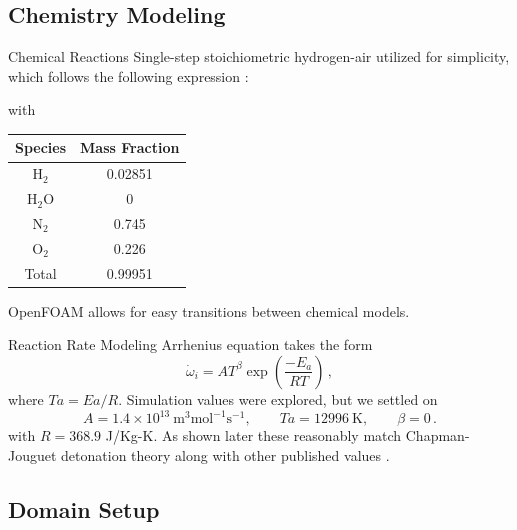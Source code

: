 \subsection{Chemistry Modeling}

\begin{frame}{Chemical Reactions}
Single-step stoichiometric hydrogen-air utilized for simplicity, which follows the following expression \cite{kuo}:
\begin{center}
\end{center}
with
\begin{table}[t!]
\centering
\begin{tabular}{cc}
Species & Mass Fraction \\ \hline
H\(_2\) & 0.02851 \\ 
H\(_2\)O & 0 \\
N\(_2\) & 0.745 \\ 
O\(_2\) & 0.226 \\ \hline
Total & 0.99951 \\ 
\end{tabular}
\end{table}
OpenFOAM allows for easy transitions between chemical models.
\end{frame}

\begin{frame}{Reaction Rate Modeling}
Arrhenius equation \cite{arrhenius} takes the form \cite{christ} 
\begin{equation}
\dot{\omega}_i = AT^\beta \exp\left(\frac{ -E_a}{R T}\right)\,,
\end{equation}
where $Ta = Ea/R$. Simulation values were explored, but we settled on 
\begin{equation}
   A = 1.4 \times 10^{13} ~ \text{m}^3\text{mol}^{-1}\text{s}^{-1},
   \qquad 
   Ta = 12996 ~\text{K},
   \qquad
   \beta = 0\,.
\end{equation}
with \(R = 368.9\) J/Kg-K. As shown later these reasonably match Chapman-Jouguet detonation theory \cite{chapman} along with other published values \cite{towery1,hashemi}.
\end{frame}

\subsection{Domain Setup}

